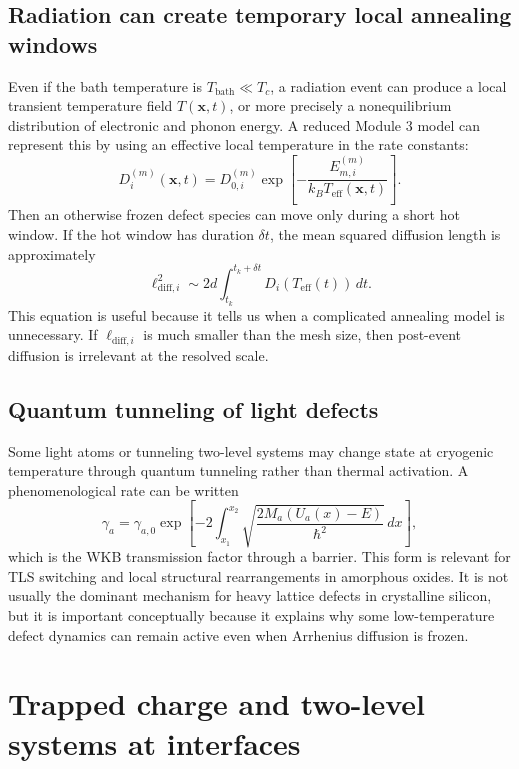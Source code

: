 \documentclass[11pt]{article}
\newcommand{\x}{\mathbf{x}}
\begin{document}
\subsection{Radiation can create temporary local annealing windows}

Even if the bath temperature is $T_{\mathrm{bath}}\ll T_c$, a radiation event can produce a local transient temperature field $T(\x,t)$, or more precisely a nonequilibrium distribution of electronic and phonon energy. A reduced Module 3 model can represent this by using an effective local temperature in the rate constants:
\begin{equation}
D_i^{(m)}(\x,t)=D_{0,i}^{(m)}\exp\left[-\frac{E_{m,i}^{(m)}}{k_BT_{\mathrm{eff}}(\x,t)}\right].
\label{eq:TeffD}
\end{equation}
Then an otherwise frozen defect species can move only during a short hot window. If the hot window has duration $\delta t$, the mean squared diffusion length is approximately
\begin{equation}
\ell_{\mathrm{diff},i}^2\sim 2d\int_{t_k}^{t_k+\delta t}D_i(T_{\mathrm{eff}}(t))\,dt.
\label{eq:transient_diff_length}
\end{equation}
This equation is useful because it tells us when a complicated annealing model is unnecessary. If $\ell_{\mathrm{diff},i}$ is much smaller than the mesh size, then post-event diffusion is irrelevant at the resolved scale.

\subsection{Quantum tunneling of light defects}

Some light atoms or tunneling two-level systems may change state at cryogenic temperature through quantum tunneling rather than thermal activation. A phenomenological rate can be written
\begin{equation}
\gamma_a=\gamma_{a,0}\exp\left[-2\int_{x_1}^{x_2}\sqrt{\frac{2M_a(U_a(x)-E)}{\hbar^2}}\,dx\right],
\label{eq:wkb_tls_rate}
\end{equation}
which is the WKB transmission factor through a barrier. This form is relevant for TLS switching and local structural rearrangements in amorphous oxides. It is not usually the dominant mechanism for heavy lattice defects in crystalline silicon, but it is important conceptually because it explains why some low-temperature defect dynamics can remain active even when Arrhenius diffusion is frozen.

\section{Trapped charge and two-level systems at interfaces}
\end{document}
